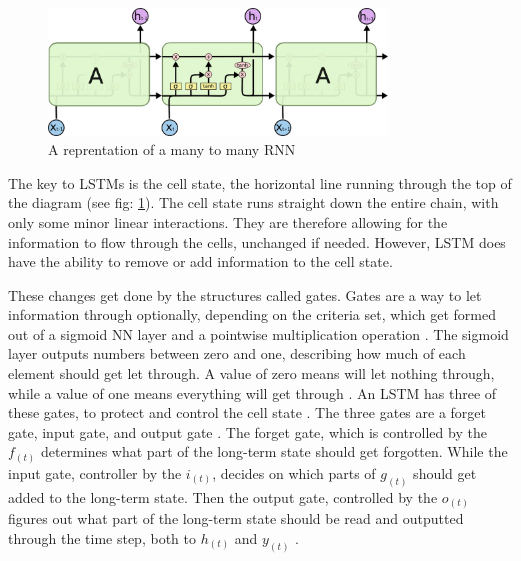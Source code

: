 \documentclass[a4paper,10pt]{article}
\begin{document}
	\begin{figure}
		\begin{center}
			\includegraphics[width=9cm]{LSTM3-chain.png}
			\caption{A reprentation of a many to many RNN \cite{lstm_networks}}
			\label{fig:LSTM_diagram}
		\end{center}
	\end{figure} 
	
	The key to LSTMs is the cell state, the horizontal line running through the top of the diagram (see fig: \ref{fig:LSTM_diagram}). The cell state runs straight down the entire chain, with only some minor linear interactions. They are therefore allowing for the information to flow through the cells, unchanged if needed. However, LSTM does have the ability to remove or add information to the cell state. 
	
	These changes get done by the structures called gates. Gates are a way to let information through optionally, depending on the criteria set, which get formed out of a sigmoid NN layer and a pointwise multiplication operation \cite{lstm_networks}. The sigmoid layer outputs numbers between zero and one, describing how much of each element should get let through. A value of zero means will let nothing through, while a value of one means everything will get through \cite{lstm_networks, geron2019hands}. An LSTM has three of these gates, to protect and control the cell state \cite{lstm_networks}. The three gates are a forget gate, input gate, and output gate \cite{illustrated_lstm_gru, geron2019hands}. The forget gate, which is controlled by the $f_{(t)}$ determines what part of the long-term state should get forgotten. While the input gate, controller by the $i_{(t)}$, decides on which parts of $g_{(t)}$ should get added to the long-term state. Then the output gate, controlled by the $o_{(t)}$ figures out what part of the long-term state should be read and outputted through the time step, both to $h_{(t)}$ and $y_{(t)}$ \cite{geron2019hands}.
	
\end{document}

